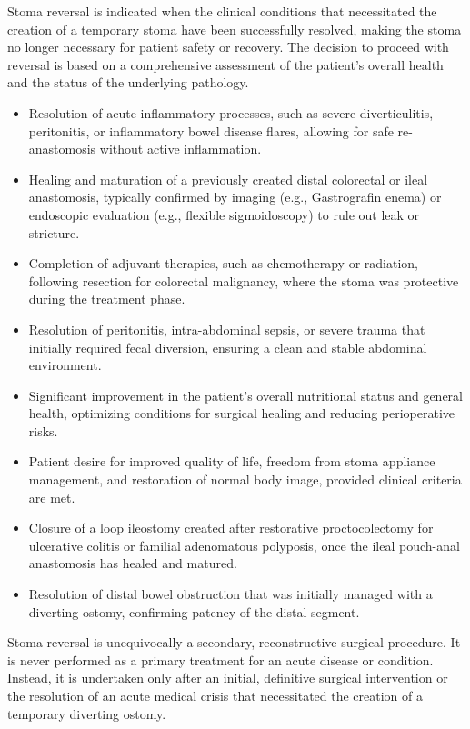 Stoma reversal is indicated when the clinical conditions that necessitated the creation of a temporary stoma have been successfully resolved, making the stoma no longer necessary for patient safety or recovery. The decision to proceed with reversal is based on a comprehensive assessment of the patient's overall health and the status of the underlying pathology.

\begin{itemize}
  \item Resolution of acute inflammatory processes, such as severe diverticulitis, peritonitis, or inflammatory bowel disease flares, allowing for safe re-anastomosis without active inflammation.
  \item Healing and maturation of a previously created distal colorectal or ileal anastomosis, typically confirmed by imaging (e.g., Gastrografin enema) or endoscopic evaluation (e.g., flexible sigmoidoscopy) to rule out leak or stricture.
  \item Completion of adjuvant therapies, such as chemotherapy or radiation, following resection for colorectal malignancy, where the stoma was protective during the treatment phase.
  \item Resolution of peritonitis, intra-abdominal sepsis, or severe trauma that initially required fecal diversion, ensuring a clean and stable abdominal environment.
  \item Significant improvement in the patient's overall nutritional status and general health, optimizing conditions for surgical healing and reducing perioperative risks.
  \item Patient desire for improved quality of life, freedom from stoma appliance management, and restoration of normal body image, provided clinical criteria are met.
  \item Closure of a loop ileostomy created after restorative proctocolectomy for ulcerative colitis or familial adenomatous polyposis, once the ileal pouch-anal anastomosis has healed and matured.
  \item Resolution of distal bowel obstruction that was initially managed with a diverting ostomy, confirming patency of the distal segment.
\end{itemize}

Stoma reversal is unequivocally a secondary, reconstructive surgical procedure. It is never performed as a primary treatment for an acute disease or condition. Instead, it is undertaken only after an initial, definitive surgical intervention or the resolution of an acute medical crisis that necessitated the creation of a temporary diverting ostomy. 

